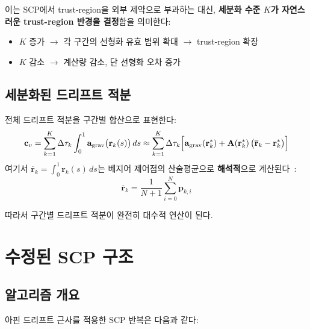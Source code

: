 \documentclass[11pt]{article}
\begin{document}
이는 SCP에서 trust-region을 외부 제약으로 부과하는 대신,
\textbf{세분화 수준 $K$가 자연스러운 trust-region 반경을 결정}함을 의미한다:
\begin{itemize}
  \item $K$ 증가 $\to$ 각 구간의 선형화 유효 범위 확대 $\to$ trust-region 확장
  \item $K$ 감소 $\to$ 계산량 감소, 단 선형화 오차 증가
\end{itemize}

\subsection{세분화된 드리프트 적분}

전체 드리프트 적분을 구간별 합산으로 표현한다:
\begin{equation}
  \mathbf{c}_v = \sum_{k=1}^K \Delta\tau_k \int_0^1
    \mathbf{a}_\text{grav}\bigl(\mathbf{r}_k(s)\bigr)\,ds
  \approx \sum_{k=1}^K \Delta\tau_k \Bigl[
    \mathbf{a}_\text{grav}(\mathbf{r}_k^*)
    + \mathbf{A}(\mathbf{r}_k^*)\,\bigl(\overline{\mathbf{r}}_k - \mathbf{r}_k^*\bigr)
  \Bigr]
  \label{eq:cv-piecewise}
\end{equation}
여기서 $\overline{\mathbf{r}}_k = \int_0^1 \mathbf{r}_k(s)\,ds$는
베지어 제어점의 산술평균으로 \textbf{해석적}으로 계산된다~\cite{report004}:
\begin{equation}
  \overline{\mathbf{r}}_k = \frac{1}{N+1}\sum_{i=0}^N \mathbf{p}_{k,i}
\end{equation}

따라서 구간별 드리프트 적분이 완전히 대수적 연산이 된다.

\section{수정된 SCP 구조}
\label{sec:modified-scp}

\subsection{알고리즘 개요}

아핀 드리프트 근사를 적용한 SCP 반복은 다음과 같다:
\end{document}
